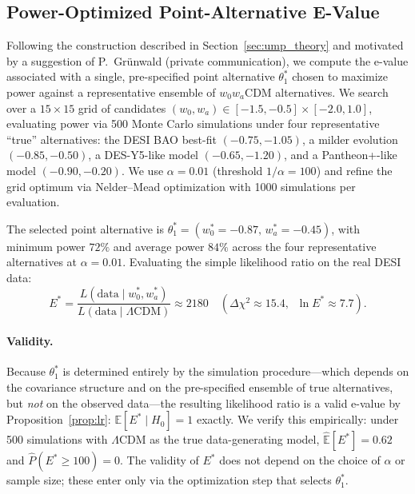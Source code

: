 \documentclass[11pt,a4paper]{article}
\newcommand{\E}{\mathbb{E}}
\newcommand{\LCDM}{$\Lambda$CDM}
\begin{document}
\subsection{Power-Optimized Point-Alternative E-Value}
\label{sec:ump}

Following the construction described in Section~\ref{sec:ump_theory} and motivated by a suggestion of P.~Gr\"unwald (private communication), we compute the e-value associated with a single, pre-specified point alternative $\theta_1^*$ chosen to maximize power against a representative ensemble of $w_0w_a$CDM alternatives. We search over a $15 \times 15$ grid of candidates $(w_0, w_a) \in [-1.5, -0.5] \times [-2.0, 1.0]$, evaluating power via 500 Monte Carlo simulations under four representative ``true'' alternatives: the DESI BAO best-fit $(-0.75, -1.05)$, a milder evolution $(-0.85, -0.50)$, a DES-Y5-like model $(-0.65, -1.20)$, and a Pantheon+-like model $(-0.90, -0.20)$. We use $\alpha = 0.01$ (threshold $1/\alpha = 100$) and refine the grid optimum via Nelder--Mead optimization with 1000 simulations per evaluation.

The selected point alternative is $\theta_1^* = (w_0^* = -0.87,\, w_a^* = -0.45)$, with minimum power $72\%$ and average power $84\%$ across the four representative alternatives at $\alpha = 0.01$. Evaluating the simple likelihood ratio on the real DESI data:
\begin{equation}
E^{*} = \frac{L(\text{data} \mid w_0^*, w_a^*)}{L(\text{data} \mid \text{\LCDM})} \approx 2180 \quad (\Delta\chi^2 \approx 15.4, \;\; \ln E^{*} \approx 7.7).
\label{eq:ump}
\end{equation}

\paragraph{Validity.} Because $\theta_1^*$ is determined entirely by the simulation procedure---which depends on the covariance structure and on the pre-specified ensemble of true alternatives, but \emph{not} on the observed data---the resulting likelihood ratio is a valid e-value by Proposition~\ref{prop:lr}: $\E[E^{*} \mid H_0] = 1$ exactly. We verify this empirically: under 500 simulations with \LCDM{} as the true data-generating model, $\hat{\E}[E^{*}] = 0.62$ and $\hat{P}(E^{*} \geq 100) = 0$. The validity of $E^{*}$ does not depend on the choice of $\alpha$ or sample size; these enter only via the optimization step that selects $\theta_1^*$.
\end{document}
